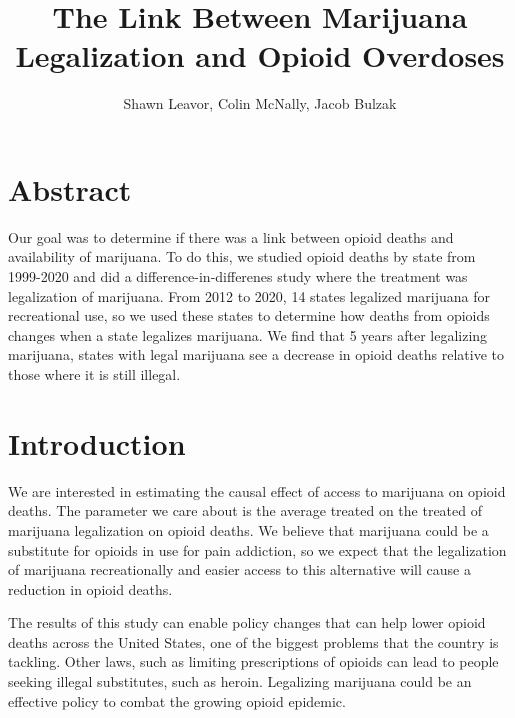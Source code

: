 \documentclass{article}
\title{The Link Between Marijuana Legalization and Opioid Overdoses} %
\author{Shawn Leavor, Colin McNally, Jacob Bulzak} %
\begin{document}
\maketitle %



\section*{Abstract} %

Our goal was to determine if there was a link between opioid deaths and availability of marijuana. To do this, we studied opioid deaths by state from 1999-2020 and did a difference-in-differenes study where the treatment was legalization of marijuana. From 2012 to 2020, 14 states legalized marijuana for recreational use, so we used these states to determine how deaths from opioids changes when a state legalizes marijuana. We find that 5 years after legalizing marijuana, states with legal marijuana see a decrease in opioid deaths relative to those where it is still illegal. 

\section*{Introduction} %

We are interested in estimating the causal effect of access to marijuana on opioid deaths. The parameter we care about is the average treated on the treated of marijuana legalization on opioid deaths. We believe that marijuana could be a substitute for opioids in use for pain addiction, so we expect that the legalization of marijuana recreationally and easier access to this alternative will cause a reduction in opioid deaths.

The results of this study can enable policy changes that can help lower opioid deaths across the United States, one of the biggest problems that the country is tackling. Other laws, such as limiting prescriptions of opioids can lead to people seeking illegal substitutes, such as heroin. Legalizing marijuana could be an effective policy to combat the growing opioid epidemic. 

\end{document}
